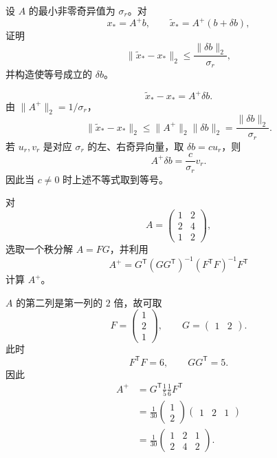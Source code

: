 \begin{exercise}[level=advanced]
设 $A$ 的最小非零奇异值为 $\sigma_r$。对
\[
x_*=A^+b,
\qquad \widetilde x_*=A^+(b+\delta b),
\]
证明
\[
\lVert\widetilde x_*-x_*\rVert_2
\le\frac{\lVert\delta b\rVert_2}{\sigma_r},
\]
并构造使等号成立的 $\delta b$。
\begin{solution}
\[
\widetilde x_*-x_*=A^+\delta b.
\]
由 $\lVert A^+\rVert_2=1/\sigma_r$，
\[
\lVert\widetilde x_*-x_*\rVert_2
\le\lVert A^+\rVert_2\lVert\delta b\rVert_2
=\frac{\lVert\delta b\rVert_2}{\sigma_r}.
\]
若 $u_r,v_r$ 是对应 $\sigma_r$ 的左、右奇异向量，取
$\delta b=cu_r$，则
\[
A^+\delta b=\frac{c}{\sigma_r}v_r.
\]
因此当 $c\ne0$ 时上述不等式取到等号。
\end{solution}
\end{exercise}

\begin{exercise}[level=advanced]
对
\[
A=\begin{pmatrix}1&2\\2&4\\1&2\end{pmatrix},
\]
选取一个秩分解 $A=FG$，并利用
\[
A^+=G^{\mathsf T}(GG^{\mathsf T})^{-1}
(F^{\mathsf T}F)^{-1}F^{\mathsf T}
\]
计算 $A^+$。
\begin{solution}
$A$ 的第二列是第一列的 $2$ 倍，故可取
\[
F=\begin{pmatrix}1\\2\\1\end{pmatrix},
\qquad
G=\begin{pmatrix}1&2\end{pmatrix}.
\]
此时
\[
F^{\mathsf T}F=6,
\qquad
GG^{\mathsf T}=5.
\]
因此
\begin{align*}
A^+
&=G^{\mathsf T}\frac15\frac16F^{\mathsf T}\\
&=\frac1{30}
\begin{pmatrix}1\\2\end{pmatrix}
\begin{pmatrix}1&2&1\end{pmatrix}\\
&=\frac1{30}
\begin{pmatrix}1&2&1\\2&4&2\end{pmatrix}.
\end{align*}
\end{solution}
\end{exercise}

